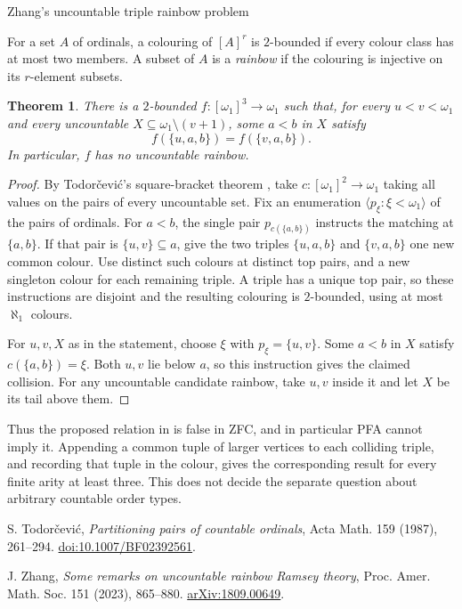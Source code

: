 \documentclass[11pt]{article}
\newtheorem{theorem}{Theorem}
\begin{document}
\begin{center}
{\LARGE Zhang's uncountable triple rainbow problem}
\end{center}
\vspace{0.6em}
\begin{abstract}
We give a ZFC counterexample to both clauses of Question 5.5 of
Jing Zhang. The construction is a matching rule indexed by the two
largest vertices of a triple, using a strong colouring of pairs.
\end{abstract}

For a set \(A\) of ordinals, a colouring of \([A]^r\) is
\(2\)-bounded if every colour class has at most two members. A subset
of \(A\) is a \emph{rainbow} if the colouring is injective on its
\(r\)-element subsets.

\begin{theorem}
There is a \(2\)-bounded \(f:[\omega_1]^3\to\omega_1\) such that,
for every \(u<v<\omega_1\) and every uncountable
\(X\subseteq\omega_1\setminus(v+1)\), some \(a<b\) in \(X\) satisfy
\[
   f(\{u,a,b\})=f(\{v,a,b\}).
\]
In particular, \(f\) has no uncountable rainbow.
\end{theorem}

\begin{proof}
By Todor\v{c}evi\'c's square-bracket theorem \cite{tod}, take
\(c:[\omega_1]^2\to\omega_1\) taking all values on the pairs of every
uncountable set. Fix an enumeration
\(\langle p_\xi:\xi<\omega_1\rangle\) of the pairs of ordinals.
For \(a<b\), the single pair \(p_{c(\{a,b\})}\) instructs the
matching at \(\{a,b\}\). If that pair is \(\{u,v\}\subseteq a\),
give the two triples \(\{u,a,b\}\) and \(\{v,a,b\}\) one new common
colour. Use distinct such colours at distinct top pairs, and a new
singleton colour for each remaining triple. A triple has a unique
top pair, so these instructions are disjoint and the resulting
colouring is \(2\)-bounded, using at most \(\aleph_1\) colours.

For \(u,v,X\) as in the statement, choose \(\xi\) with
\(p_\xi=\{u,v\}\). Some \(a<b\) in \(X\) satisfy \(c(\{a,b\})=\xi\).
Both \(u,v\) lie below \(a\), so this instruction gives the claimed
collision. For any uncountable candidate rainbow, take \(u,v\) inside
it and let \(X\) be its tail above them.
\end{proof}

Thus the proposed relation in \cite[Question 5.5]{zhang} is false in
ZFC, and in particular PFA cannot imply it. Appending a common tuple
of larger vertices to each colliding triple, and recording that tuple
in the colour, gives the corresponding result for every finite
arity at least three. This does not decide the separate question
about arbitrary countable order types.

\begin{thebibliography}{9}
S. Todor\v{c}evi\'c, \emph{Partitioning pairs of countable ordinals},
Acta Math. 159 (1987), 261--294.
\href{https://doi.org/10.1007/BF02392561}{doi:10.1007/BF02392561}.

J. Zhang, \emph{Some remarks on uncountable rainbow Ramsey theory},
Proc. Amer. Math. Soc. 151 (2023), 865--880.
\href{https://arxiv.org/abs/1809.00649}{arXiv:1809.00649}.
\end{thebibliography}
\end{document}
